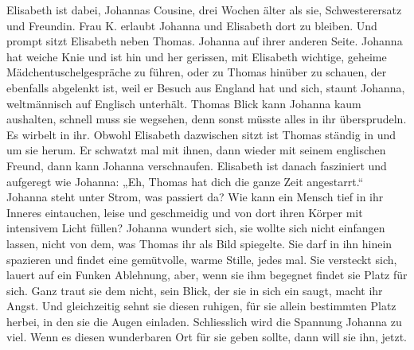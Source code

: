  Elisabeth ist dabei,  Johannas Cousine, drei Wochen älter als sie, Schwesterersatz und Freundin. Frau K. erlaubt Johanna und Elisabeth dort zu bleiben. Und prompt sitzt Elisabeth neben Thomas. Johanna auf ihrer anderen Seite. Johanna hat weiche Knie und ist hin und her gerissen, mit Elisabeth wichtige, geheime Mädchentuschelgespräche zu führen, oder zu Thomas hinüber zu schauen, der ebenfalls abgelenkt ist, weil er Besuch aus England hat und sich, staunt Johanna, weltmännisch auf Englisch unterhält. 
Thomas Blick kann Johanna kaum aushalten, schnell muss sie wegsehen, denn sonst müsste alles in ihr übersprudeln. Es wirbelt in ihr. Obwohl Elisabeth dazwischen sitzt ist Thomas ständig in und um sie herum. Er schwatzt mal mit ihnen, dann wieder mit seinem englischen Freund, dann kann Johanna verschnaufen. 
Elisabeth ist danach fasziniert und aufgeregt wie Johanna: „Eh, Thomas hat dich die ganze Zeit angestarrt.“ Johanna steht unter Strom, was passiert da? Wie kann ein Mensch tief in ihr Inneres eintauchen, leise und geschmeidig und von dort ihren Körper mit intensivem Licht füllen? Johanna wundert sich, sie wollte sich nicht einfangen lassen, nicht von dem, was Thomas ihr als Bild spiegelte. 
Sie darf in ihn hinein spazieren und findet eine gemütvolle, warme Stille, jedes mal. Sie versteckt sich, lauert auf ein Funken Ablehnung, aber, wenn sie ihm begegnet findet sie Platz für sich. 
Ganz traut sie dem nicht, sein Blick, der sie in sich ein saugt, macht ihr Angst. Und gleichzeitig sehnt sie diesen ruhigen, für sie allein bestimmten Platz herbei, in den sie die Augen einladen. Schliesslich wird die Spannung Johanna zu viel. Wenn es diesen wunderbaren Ort für sie geben sollte, dann will sie ihn, jetzt.

